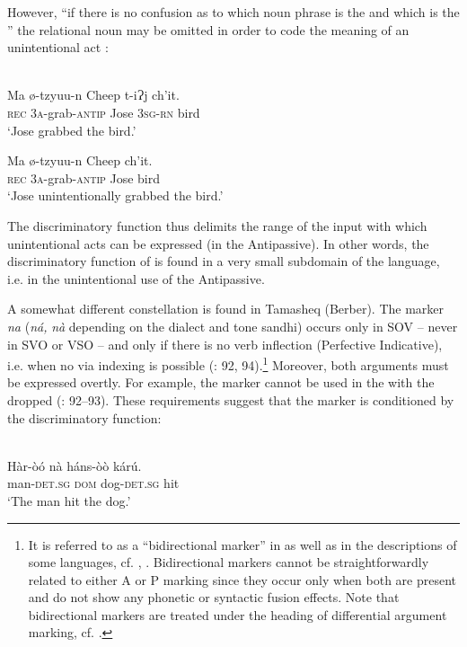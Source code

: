 \documentclass[output=paper]{langsci/langscibook}
\begin{document}
However, “if there is no confusion as to which noun phrase is the  and which is the ” the relational noun may be omitted in order to code the meaning of an unintentional act \citep[212]{England1983}:

\ea 
{}\\
\ea
\gll  Ma  ø-tzyuu-n   Cheep   t-iɁj    ch'it. \\
     \textsc{rec} 3\textsc{a}{}-grab-\textsc{antip}   Jose   3\textsc{sg}{}-\textsc{rn} bird\\
\glt ‘Jose grabbed the bird.’

\ex
\gll Ma  ø-tzyuu-n   Cheep   ch'it. \\
     \textsc{rec} 3\textsc{a}{}-grab-\textsc{antip}   Jose   bird\\
\glt ‘Jose unintentionally grabbed the bird.’
\z
\z

The discriminatory function thus delimits the range of the input with which unintentional acts can be expressed (in the Antipassive). In other words, the discriminatory function of  is found in a very small subdomain of the language, i.e. in the unintentional use of the Antipassive.

A somewhat different constellation is found in Tamasheq (Berber). The marker \textit{na} (\textit{ná,} \textit{nà} depending on the dialect and tone sandhi) occurs only in SOV  – never in SVO or VSO – and only if there is no verb inflection (Perfective Indicative), i.e. when no  via indexing is possible (\citealt{Heath2007}: 92, 94).\footnote{It is referred to as a “bidirectional  marker” in \citet{Heath2007} as well as in the descriptions of some  languages, cf. \citet{Diagana1995}, \citet{Nikitina2018}. Bidirectional  markers cannot be straightforwardly related to either A or P marking since they occur only when both are present and do not show any phonetic or syntactic fusion effects. Note that bidirectional  markers are treated under the heading of differential argument marking, cf. \citet{Nikitina2018}.} Moreover, both arguments must be expressed overtly. For example, the marker cannot be used in the  with the  dropped (\citealt{Heath2007}: 92–93). These requirements suggest that the marker is conditioned by the discriminatory function:

\ea 
{}\\
\gll Hàr-òó    nà  háns-òò  kárú.\\
     man-\textsc{det.sg}  \textsc{dom}  dog-\textsc{det.sg}  hit\\
\glt ‘The man hit the dog.’
\z
\end{document}
